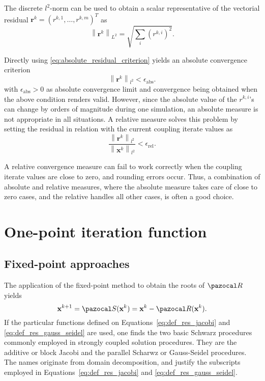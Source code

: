 The discrete  $l^{2}$-norm can be used to obtain a scalar representative of the vectorial residual \(\mathbf r^{k}=\left(r^{k,1}, \ldots, r^{k,m}\right)^{T}\) as
\begin{equation} \label{eq:absolute_residual_criterion}
\left\|\mathbf{r}^{k}\right\|_{L^{2}}=\sqrt{\sum_{i}\left(r^{k, i}\right)^{2}}.
\end{equation}

Directly using \eqref{eq:absolute_residual_criterion} yields an absolute convergence criterion
\begin{equation}
\left\|\boldsymbol{r} ^{k}\right\|_{l^{2}}<\epsilon_\mathrm{abs}.
\end{equation}
with $\epsilon_\mathrm{abs}>0$ as absolute convergence limit and convergence being obtained when the above condition renders valid.
However, since the absolute value of the $r^{k, i} $'s can change by orders of magnitude during one simulation, an absolute measure is not appropriate in all situations.
A relative measure solves this problem by setting the residual in relation with the current coupling iterate values as
\begin{equation}
\frac{\left\|\mathbf{r}^{k}\right\|_{l^{2}}}{\left\|\mathbf{x}^{k}\right\|_{l^{2}}}<\epsilon_\mathrm{rel}.
\end{equation}

A relative convergence measure can fail to work correctly when the coupling iterate values are close to zero, and rounding errors occur.
Thus, a combination of absolute and relative measures, where the absolute measure takes care of close to zero cases, and the relative handles all other cases, is often a good choice.



\section{One-point iteration function}

\subsection{Fixed-point approaches} \label{sec:fixed_point_approach}

The application of the fixed-point method to obtain the roots of \(\pazocal R\) yields
\begin{equation}
  \mathbf x^{k+1} = \pazocal S(\mathbf x^k) = \mathbf x^k - \pazocal R(\mathbf x^k).
\end{equation}
If the particular functions defined on Equations~\eqref{eq:def_res_jacobi} and \eqref{eq:def_res_gauss_seidel} are used, one finds the  two basic Schwarz procedures commonly employed in strongly coupled solution procedures.
They are the additive or block Jacobi and the parallel Scharwz or Gauss-Seidel procedures.
The names originate from domain decomposition, and justify the subscripts employed in Equations~\eqref{eq:def_res_jacobi} and \eqref{eq:def_res_gauss_seidel}.

